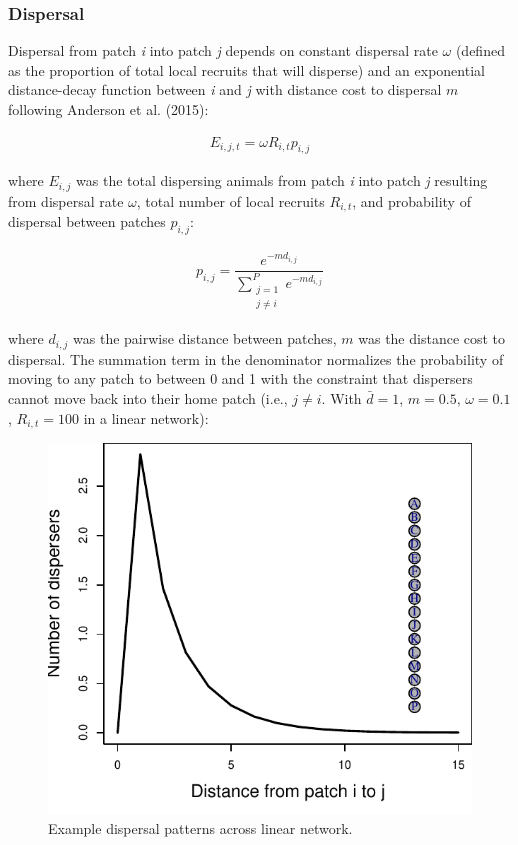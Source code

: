 \documentclass[
]{article}
\begin{document}
\hypertarget{dispersal}{%
\subsubsection{Dispersal}\label{dispersal}}

Dispersal from patch \emph{i} into patch \emph{j} depends on constant
dispersal rate \(\omega\) (defined as the proportion of total local
recruits that will disperse) and an exponential distance-decay function
between \emph{i} and \emph{j} with distance cost to dispersal \(m\)
following Anderson et al. (2015):

\begin{align}
E_{i,j,t}=\omega R_{i,t}p_{i,j}
\end{align}

where \(E_{i,j}\) was the total dispersing animals from patch \emph{i}
into patch \emph{j} resulting from dispersal rate \(\omega\), total
number of local recruits \(R_{i,t}\), and probability of dispersal
between patches \(p_{i,j}\):

\begin{align}
p_{i,j}=\dfrac{e^{-md_{i,j}}}{\sum\limits_{\substack{j=1 \\ j\neq i}}^{P} e^{-md_{i,j}}}
\end{align}

where \(d_{i,j}\) was the pairwise distance between patches, \(m\) was
the distance cost to dispersal. The summation term in the denominator
normalizes the probability of moving to any patch to between 0 and 1
with the constraint that dispersers cannot move back into their home
patch (i.e., \(j\neq i\). With \(\bar{d}= 1\), \(m=0.5\),
\(\omega=0.1\), \(R_{i,t}=100\) in a linear network):

\begin{figure}[H]

{\centering \includegraphics{Managing_for_ecological_surprises_in_metapopulations_files/figure-latex/dispersal-1} 

}

\caption{Example dispersal patterns across linear network.}\label{fig:dispersal}
\end{figure}
\end{document}
